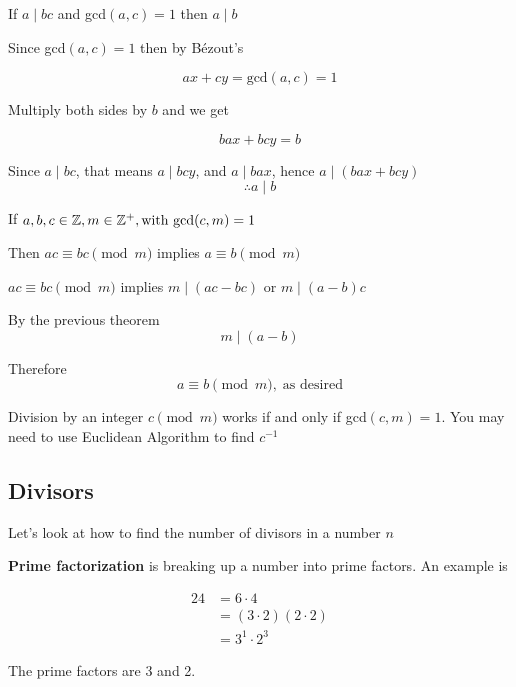 \documentclass[../../Main.tex]{subfiles}
\begin{document}
\begin{theorem}
    If $a \mid bc$ and gcd$(a, c) = 1$ then $a \mid b$
    
    \begin{poof}
        Since gcd$(a, c) = 1$ then by B\'{e}zout's

        $$ax + cy = \text{gcd}(a, c) = 1$$

        Multiply both sides by $b$ and we get

        $$bax + bcy = b$$

        Since $a \mid bc$, that means $a \mid bcy$, and $a \mid bax$, hence $a \mid (bax + bcy)$
        $$\therefore a \mid b$$
    \end{poof}
\end{theorem}

\begin{theorem}
    If $a, b, c \in \mathbb{Z}, m \in \mathbb{Z}^+, \text{with gcd}(c, m) = 1$

    Then $ac \equiv bc \pmod{m}$ implies $a \equiv b \pmod{m}$

    \begin{poof}
        $ac \equiv bc \pmod{m}$ implies $m \mid (ac - bc)$ or $m \mid (a - b)c$

        By the previous theorem
        $$m \mid (a - b)$$

        Therefore 
        $$a \equiv b \pmod{m}, \; \text{as desired}$$
    \end{poof}

    \begin{note}
        Division by an integer $c \pmod{m}$ works if and only if gcd$(c, m) = 1$. 
        You may need to use Euclidean Algorithm to find $c^{-1}$
    \end{note}
\end{theorem}

\subsection{Divisors}

Let's look at how to find the number of divisors in a number $n$

\begin{definition}
    \textbf{Prime factorization} is breaking up a number into prime factors. An example is

    \begin{align*}
        24 &= 6 \cdot 4 \\
        &= (3 \cdot 2)(2 \cdot 2) \\
        &= 3^1 \cdot 2^3
    \end{align*}

    The prime factors are 3 and 2.
\end{definition}
\end{document}
